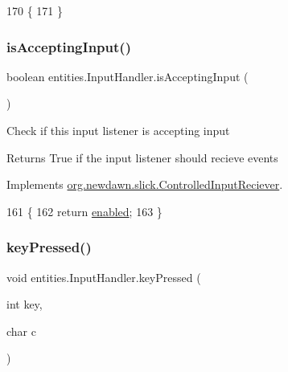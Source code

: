 \begin{DoxyCode}
170                                \{
171     \}
\end{DoxyCode}
\mbox{\label{classentities_1_1_input_handler_a3b0b01f1e82200097d90346ebe12e369}} 
\subsubsection{\texorpdfstring{is\+Accepting\+Input()}{isAcceptingInput()}}
{\footnotesize\ttfamily boolean entities.\+Input\+Handler.\+is\+Accepting\+Input (\begin{DoxyParamCaption}{ }\end{DoxyParamCaption})\hspace{0.3cm}{\ttfamily [inline]}}

Check if this input listener is accepting input

\begin{DoxyReturn}{Returns}
True if the input listener should recieve events 
\end{DoxyReturn}


Implements \mbox{\hyperlink{interfaceorg_1_1newdawn_1_1slick_1_1_controlled_input_reciever_a380186fb0c34c11c212b72fae8186dc7}{org.\+newdawn.\+slick.\+Controlled\+Input\+Reciever}}.


\begin{DoxyCode}
161                                       \{
162         \textcolor{keywordflow}{return} \mbox{\hyperlink{classentities_1_1_input_handler_a438eff19a77640d2055a83c332aff302}{enabled}};
163     \}
\end{DoxyCode}
\mbox{\label{classentities_1_1_input_handler_a9e9d7c64bd18e93dfb7d8247ab635036}} 
\subsubsection{\texorpdfstring{key\+Pressed()}{keyPressed()}}
{\footnotesize\ttfamily void entities.\+Input\+Handler.\+key\+Pressed (\begin{DoxyParamCaption}\item[{int}]{key,  }\item[{char}]{c }\end{DoxyParamCaption})\hspace{0.3cm}{\ttfamily [inline]}}

